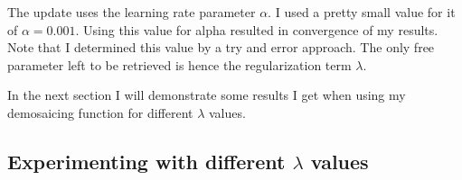 \documentclass{paper}
\begin{document}
The update uses the learning rate parameter $\alpha$. I used a pretty small value for it of $\alpha=0.001$. Using this value for alpha resulted in convergence of my results. Note that I determined this value by a try and error approach. The only free parameter left to be retrieved is hence the regularization term $\lambda$.

In the next section I will demonstrate some results I get when using my demosaicing function for different $\lambda$ values. 

\subsection{Experimenting with different $\lambda$ values}

\begin{figure}[h!]
\begin{center}
\end{center}
\end{figure}
\end{document}
